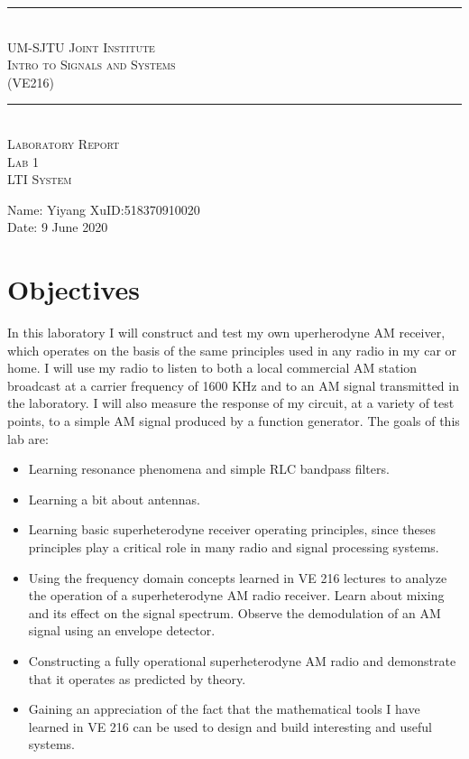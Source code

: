 \documentclass[utf8]{article}
\begin{document}
\begin{center}
\vspace*{2cm}
\rule{14cm}{0.5pt}\\
\Large{\textsc{UM-SJTU Joint Institute\\
Intro to Signals and Systems\\
(VE216)\\}}
\rule{14cm}{0.5pt}\\
\vspace*{3cm}
\Large{\textsc{Laboratory Report\\
Lab 1\\
LTI System}}
\vspace*{3cm}
\end{center}
\large{Name: Yiyang Xu\qquad ID:518370910020\\
Date: 9 June 2020}
\newpage

\section{Objectives}
{
	In this laboratory I will construct and test my own uperherodyne AM receiver, which operates on the basis of the same principles used in any radio in my car or home. I will use my radio to listen to both a local commercial AM station broadcast at a carrier frequency of 1600 KHz and to an AM signal transmitted in the laboratory. I will also measure the response of my circuit, at a variety of test points, to a simple AM signal produced by a function generator. The goals of this lab are:
\begin{itemize}
\item Learning resonance phenomena and simple RLC bandpass filters.
\item Learning a bit about antennas.
\item Learning basic superheterodyne receiver operating principles, since theses principles play a critical role in many radio and signal processing systems.
\item Using the frequency domain concepts learned in VE 216 lectures to analyze the operation of a
superheterodyne AM radio receiver. Learn about mixing and its effect on the signal spectrum. Observe the demodulation of an AM signal using an envelope detector.
\item Constructing a fully operational superheterodyne AM radio and demonstrate that it operates as predicted by theory.
\item Gaining an appreciation of the fact that the mathematical tools I have learned in VE 216 can be used to design and build interesting and useful systems.
\end{itemize}
}
\end{document}
